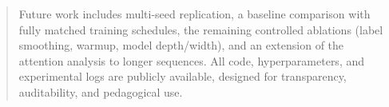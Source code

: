 \begin{abstract}
Future work includes multi-seed replication, a baseline comparison with fully matched training schedules, the remaining controlled ablations (label smoothing, warmup, model depth/width), and an extension of the attention analysis to longer sequences. All code, hyperparameters, and experimental logs are publicly available, designed for transparency, auditability, and pedagogical use.
\end{abstract}
